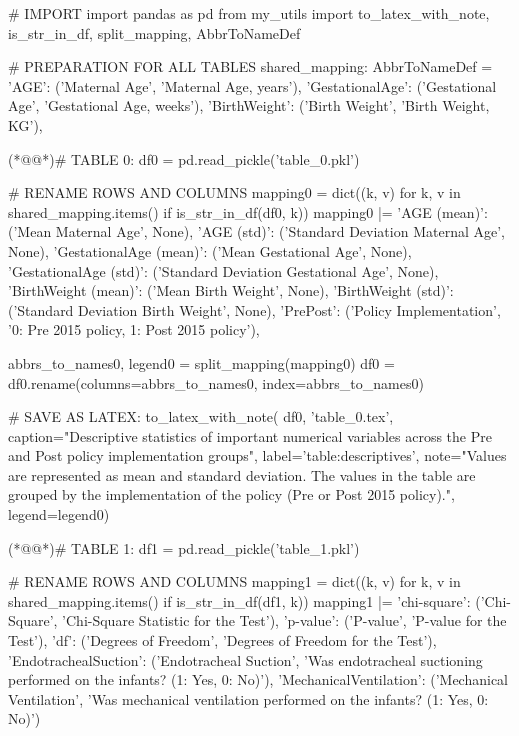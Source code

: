 \documentclass[11pt]{article}
\begin{document}
\begin{python}

# IMPORT
import pandas as pd
from my_utils import to_latex_with_note, is_str_in_df, split_mapping, AbbrToNameDef

# PREPARATION FOR ALL TABLES
shared_mapping: AbbrToNameDef = {
    'AGE': ('Maternal Age', 'Maternal Age, years'),
    'GestationalAge': ('Gestational Age', 'Gestational Age, weeks'),
    'BirthWeight': ('Birth Weight', 'Birth Weight, KG'),
}

(*@@*)# TABLE 0:
df0 = pd.read_pickle('table_0.pkl')

# RENAME ROWS AND COLUMNS
mapping0 = dict((k, v) for k, v in shared_mapping.items() if is_str_in_df(df0, k))
mapping0 |= {
    'AGE (mean)': ('Mean Maternal Age', None),
    'AGE (std)': ('Standard Deviation Maternal Age', None),
    'GestationalAge (mean)': ('Mean Gestational Age', None),
    'GestationalAge (std)': ('Standard Deviation Gestational Age', None),
    'BirthWeight (mean)': ('Mean Birth Weight', None),
    'BirthWeight (std)': ('Standard Deviation Birth Weight', None),
    'PrePost': ('Policy Implementation', '0: Pre 2015 policy, 1: Post 2015 policy'),
}

abbrs_to_names0, legend0 = split_mapping(mapping0)
df0 = df0.rename(columns=abbrs_to_names0, index=abbrs_to_names0)

# SAVE AS LATEX:
to_latex_with_note(
    df0, 'table_0.tex',
    caption="Descriptive statistics of important numerical variables across the Pre and Post policy implementation groups", 
    label='table:descriptives',
    note="Values are represented as mean and standard deviation. The values in the table are grouped by the implementation of the policy (Pre or Post 2015 policy).",
    legend=legend0)

(*@@*)# TABLE 1:
df1 = pd.read_pickle('table_1.pkl')

# RENAME ROWS AND COLUMNS
mapping1 = dict((k, v) for k, v in shared_mapping.items() if is_str_in_df(df1, k)) 
mapping1 |= {
    'chi-square': ('Chi-Square', 'Chi-Square Statistic for the Test'),
    'p-value': ('P-value', 'P-value for the Test'),
    'df': ('Degrees of Freedom', 'Degrees of Freedom for the Test'),
    'EndotrachealSuction': ('Endotracheal Suction', 'Was endotracheal suctioning performed on the infants? (1: Yes, 0: No)'),
    'MechanicalVentilation': ('Mechanical Ventilation', 'Was mechanical ventilation performed on the infants? (1: Yes, 0: No)')
}


\end{python}
\end{document}
